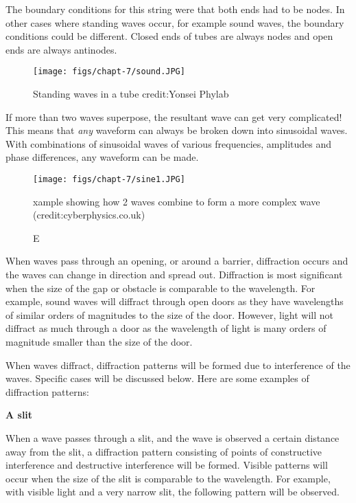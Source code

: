 \documentclass[revision-guide.tex]{subfiles}
\begin{document}
The boundary conditions for this string were that both ends had to be nodes. In other cases where standing waves occur, for example sound waves, the boundary conditions could be different. Closed ends of tubes are always nodes and open ends are always antinodes.

\begin{figure}[h!]
\centering
\texttt{[image: figs/chapt-7/sound.JPG]}
\caption{Standing waves in a tube {credit:Yonsei Phylab}}
\end{figure}


If more than two waves superpose, the resultant wave can get very complicated! This means that \emph{any} waveform can always be broken down into sinusoidal waves. With combinations of sinusoidal waves of various frequencies, amplitudes and phase differences, any waveform can be made.

\begin{figure}[h!]
\centering
\texttt{[image: figs/chapt-7/sine1.JPG]}
\caption Example showing how 2 waves combine to form a more complex wave (credit:cyberphysics.co.uk)
\end{figure}



When waves pass through an opening, or around a barrier, diffraction occurs and the waves can change in direction and spread out. Diffraction is most significant when the size of the gap or obstacle is comparable to the wavelength. For example, sound waves will diffract through open doors as they have wavelengths of similar orders of magnitudes to the size of the door. However, light will not diffract as much through a door as the wavelength of light is many orders of magnitude smaller than the size of the door.

When waves diffract, diffraction patterns will be formed due to interference of the waves. Specific cases will be discussed below. Here are some examples of diffraction patterns:

\textbf{A slit}

When a wave passes through a slit, and the wave is observed a certain distance away from the slit, a diffraction pattern consisting of points of constructive interference and destructive interference will be formed. Visible patterns will occur when the size of the slit is comparable to the wavelength. For example, with visible light and a very narrow slit, the following pattern will be observed.
\end{document}
